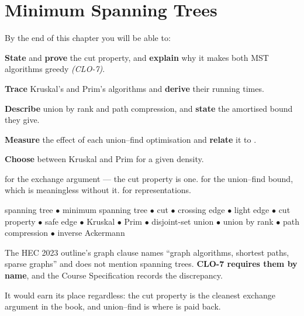 \chapter{Minimum Spanning Trees}\label{ch:mst}

\begin{outcomes}
By the end of this chapter you will be able to:
\begin{tight}
  \item \textbf{State} and \textbf{prove} the cut property, and
        \textbf{explain} why it makes both MST algorithms greedy
        \emph{(CLO-7)}.
  \item \textbf{Trace} Kruskal's and Prim's algorithms and \textbf{derive}
        their running times.
  \item \textbf{Describe} union by rank and path compression, and
        \textbf{state} the amortised bound they give.
  \item \textbf{Measure} the effect of each union--find optimisation and
        \textbf{relate} it to .
  \item \textbf{Choose} between Kruskal and Prim for a given density.
\end{tight}
\end{outcomes}

\begin{prereq}
 for the exchange argument --- the cut property is one.
 for the union--find bound, which is meaningless without it.
 for representations.
\end{prereq}

\begin{keyterms}
spanning tree $\bullet$ minimum spanning tree $\bullet$ cut $\bullet$
crossing edge $\bullet$ light edge $\bullet$ cut property $\bullet$ safe edge
$\bullet$ Kruskal $\bullet$ Prim $\bullet$ disjoint-set union $\bullet$ union
by rank $\bullet$ path compression $\bullet$ inverse Ackermann
\end{keyterms}

\begin{alertbox}
The HEC 2023 outline's graph clause names ``graph algorithms, shortest paths,
sparse graphs'' and does not mention spanning trees. \textbf{CLO-7 requires
them by name}, and the Course Specification records the discrepancy.

\smallskip
It would earn its place regardless: the cut property is the cleanest exchange
argument in the book, and union--find is where  is paid back.
\end{alertbox}


